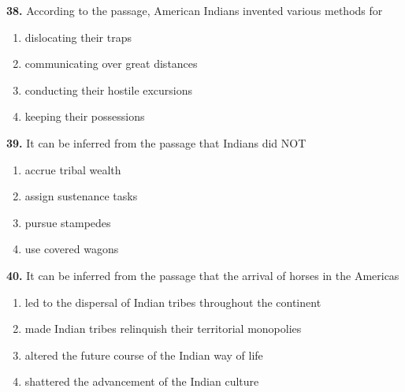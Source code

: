 \documentclass[12pt]{article}
\begin{document}
\par
\vspace{0.25\baselineskip}
\noindent\textbf{38.} According to the passage, American Indians invented various methods for
\begin{enumerate}[label=(\Alph*),leftmargin=*,itemsep=0.2em]
\item dislocating their traps
\item communicating over great distances
\item conducting their hostile excursions
\item keeping their possessions
\end{enumerate}
\par
\vspace{0.25\baselineskip}
\noindent\textbf{39.} It can be inferred from the passage that Indians did NOT
\begin{enumerate}[label=(\Alph*),leftmargin=*,itemsep=0.2em]
\item accrue tribal wealth
\item assign sustenance tasks
\item pursue stampedes
\item use covered wagons
\end{enumerate}
\par
\vspace{0.25\baselineskip}
\noindent\textbf{40.} It can be inferred from the passage that the arrival of horses in the Americas
\begin{enumerate}[label=(\Alph*),leftmargin=*,itemsep=0.2em]
\item led to the dispersal of Indian tribes throughout the continent
\item made Indian tribes relinquish their territorial monopolies
\item altered the future course of the Indian way of life
\item shattered the advancement of the Indian culture
\end{enumerate}
\par
\vspace{0.25\baselineskip}
\end{document}
